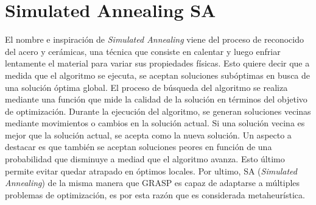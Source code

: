             \section{Simulated Annealing SA}
                El nombre e inspiración de \textit{Simulated Annealing} viene del proceso de reconocido del acero y cerámicas, una técnica que consiste en calentar y luego enfriar lentamente el material para variar sus propiedades físicas.\parencite{WikipediaTSP}
                \newline
                \newline
                Esto quiere decir que a medida que el algoritmo se ejecuta, se aceptan soluciones subóptimas en busca de una solución óptima global.  
                \newline
                \newline
                El proceso de búsqueda del algoritmo se realiza mediante una función que mide la calidad de la solución en términos del objetivo de optimización. Durante la ejecución del algoritmo, se generan soluciones vecinas mediante movimientos o cambios en la solución actual. Si una solución vecina es mejor que la solución actual, se acepta como la nueva solución. Un aspecto a destacar es que también se aceptan soluciones peores en función de una probabilidad que disminuye a mediad que el algoritmo avanza. Esto último permite evitar quedar atrapado en óptimos locales. 
                \newline
                \newline
                Por ultimo, SA (\textit{Simulated Annealing}) de la misma manera que GRASP es capaz de adaptarse a múltiples problemas de optimización, es por esta razón que es considerada metaheurística. 
    
